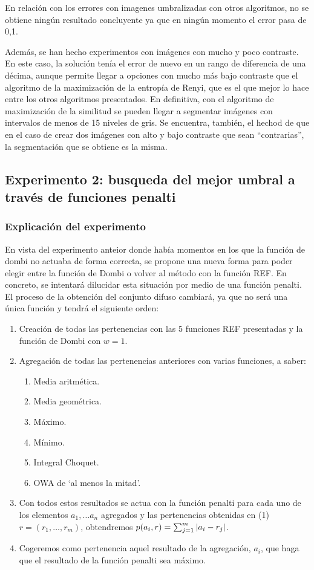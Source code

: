 En relación con los errores con imagenes umbralizadas con otros algoritmos, no se obtiene ningún resultado concluyente ya que en ningún momento el error pasa de 0,1.

Además, se han hecho experimentos con imágenes con mucho y poco contraste. En este caso, la solución tenía el error de nuevo en un rango de diferencia de una décima, aunque permite llegar a opciones con mucho más bajo contraste que el algoritmo de la maximización de la entropía de Renyi, que es el que mejor lo hace entre los otros algoritmos presentados. En definitiva, con el algoritmo de maximización de la similitud se pueden llegar a segmentar imágenes con intervalos de menos de 15 niveles de gris. Se encuentra, también, el hechod de que en el caso de crear dos imágenes con alto y bajo contraste que sean ``contrarias'', la segmentación que se obtiene es la misma.


\subsection{Experimento 2: busqueda del mejor umbral a través de funciones penalti\label{sec:exp2}}
\subsubsection{Explicación del experimento}
En vista del experimento anteior donde había momentos en los que la función de dombi no actuaba de forma correcta, se propone una nueva forma para poder elegir entre la función de Dombi o volver al método con la función REF. En concreto, se intentará dilucidar esta situación por medio de una función penalti. El proceso de la obtención del conjunto difuso cambiará, ya que no será una única función y tendrá el siguiente orden:
\begin{enumerate}
    \item Creación de todas las pertenencias con las 5 funciones REF presentadas y la función de Dombi con $w=1$.
    \item Agregación de todas las pertenencias anteriores con varias funciones, a saber:
        \begin{enumerate}
            \item Media aritmética.
            \item Media geométrica.
            \item Máximo.
            \item Mínimo.
            \item Integral Choquet.
            \item OWA de `al menos la mitad'. %
        \end{enumerate}    
    \item Con todos estos resultados se actua con la función penalti para cada uno de los elementos $a_1,\dots a_n$ agregados y las pertenencias obtenidas en (1) $r=(r_1,\dots, r_m)$, obtendremos $p(a_i, r)=\sum_{j=1}^m \left\vert a_i-r_j\right\vert$.
    \item Cogeremos como pertenencia aquel resultado de la agregación, $a_i$, que haga que el resultado de la función penalti sea máximo.  
\end{enumerate}

